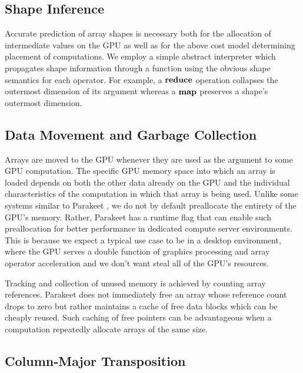 \documentclass[preprint]{sigplanconf}
\begin{document}
\subsection{Shape Inference}
\label{shapeinference}
Accurate prediction of array shapes is necessary both for the allocation of intermediate values on the GPU as well as for the above cost model determining placement of computations. We employ a simple abstract interpreter which propagates shape information through a function using the obvious shape semantics for each operator. For example, a $\mbox{\textbf{reduce}}$ operation collapses the outermost dimension of its argument whereas a $\mbox{\textbf{map}}$ preserves a shape's outermost dimension.

\subsection{Data Movement and Garbage Collection} 
Arrays are moved to the GPU whenever they are used as the argument to some GPU computation. The specific GPU memory space into which an array is loaded depends on both the other data already on the GPU and the individual characteristics of the computation in which that array is being used.
Unlike some systems similar to Parakeet \cite{Chaf11}, we do not by default preallocate the entirety of the GPU's memory.  Rather, Parakeet has a runtime flag that can enable such preallocation for better performance in dedicated compute server environments.  This is because we expect a typical use case to be in a desktop environment, where the GPU serves a double function of graphics processing and array operator acceleration and we don't want steal all of the GPU's resources.

Tracking and collection of unused memory is achieved by counting array references. Parakeet does not immediately free an array whose reference count drops to zero but rather maintains a cache of free data blocks which can be cheaply reused. Such caching of free pointers can be advantageous when a computation repeatedly allocate arrays of the same size. 

\subsection{Column-Major Transposition}
\label{colmajor}
\end{document}
